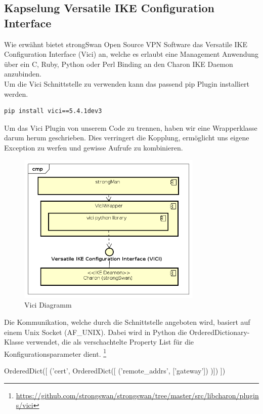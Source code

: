 \subsection{Kapselung Versatile IKE Configuration Interface}
Wie erwähnt bietet strongSwan Open Source VPN Software das Versatile
IKE Configuration Interface (Vici) an, welche es erlaubt eine Management Anwendung über ein C, Ruby, Python oder Perl Binding an den Charon
IKE Daemon anzubinden.\\
Um die Vici Schnittstelle zu verwenden kann das passend pip Plugin installiert werden.
\\
\begin{lstlisting}[style=BashInputStyle]
	pip install vici==5.4.1dev3
\end{lstlisting}
\medskip
Um das Vici Plugin von unserem Code zu trennen, haben wir eine Wrapperklasse darum herum geschrieben. Dies verringert die Kopplung, ermöglicht uns eigene Exception zu werfen und gewisse Aufrufe zu kombinieren. \\
\begin{figure}[H]
\centering
\includegraphics[width=250pt]{images/vici_wrapper.png}
\caption[Vici Diagramm]{Vici Diagramm}
\end{figure}
\medskip
Die Kommunikation, welche durch die Schnittstelle angeboten wird, basiert auf einem Unix Socket (AF\_UNIX). Dabei wird in Python die OrderedDictionary-Klasse verwendet, die als verschachtelte Property List für die Konfigurationsparameter dient. \footnote{\url{https://github.com/strongswan/strongswan/tree/master/src/libcharon/plugins/vici}}\\

\begin{python}
OrderedDict([
	('cert', OrderedDict([
		('remote_addrs', ['gateway'])
	)])
])
\end{python}
